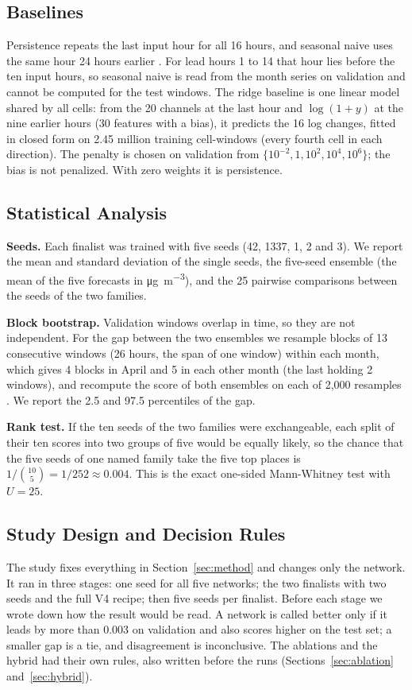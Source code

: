 \documentclass[journal]{IEEEtran}
\newcommand{\ugm}{\si{\micro\gram\per\cubic\metre}}
\begin{document}
\subsection{Baselines}
Persistence repeats the last input hour for all 16 hours, and seasonal naive uses the same hour 24 hours earlier \cite{hyndman2021}. For lead hours 1 to 14 that hour lies before the ten input hours, so seasonal naive is read from the month series on validation and cannot be computed for the test windows. The ridge baseline is one linear model shared by all cells: from the 20 channels at the last hour and $\log(1+y)$ at the nine earlier hours (30 features with a bias), it predicts the 16 log changes, fitted in closed form on 2.45 million training cell-windows (every fourth cell in each direction). The penalty is chosen on validation from $\{10^{-2}, 1, 10^{2}, 10^{4}, 10^{6}\}$; the bias is not penalized. With zero weights it is persistence.

\subsection{Statistical Analysis}
\label{sec:stats}
\textbf{Seeds.} Each finalist was trained with five seeds (42, 1337, 1, 2 and 3). We report the mean and standard deviation of the single seeds, the five-seed ensemble (the mean of the five forecasts in \ugm), and the 25 pairwise comparisons between the seeds of the two families.

\textbf{Block bootstrap.} Validation windows overlap in time, so they are not independent. For the gap between the two ensembles we resample blocks of 13 consecutive windows (26 hours, the span of one window) within each month, which gives 4 blocks in April and 5 in each other month (the last holding 2 windows), and recompute the score of both ensembles on each of 2{,}000 resamples \cite{kunsch1989}. We report the 2.5 and 97.5 percentiles of the gap.

\textbf{Rank test.} If the ten seeds of the two families were exchangeable, each split of their ten scores into two groups of five would be equally likely, so the chance that the five seeds of one named family take the five top places is $1/\binom{10}{5}=1/252\approx0.004$. This is the exact one-sided Mann-Whitney test with $U=25$.

\subsection{Study Design and Decision Rules}
\label{sec:study}
The study fixes everything in Section~\ref{sec:method} and changes only the network. It ran in three stages: one seed for all five networks; the two finalists with two seeds and the full V4 recipe; then five seeds per finalist. Before each stage we wrote down how the result would be read. A network is called better only if it leads by more than 0.003 on validation and also scores higher on the test set; a smaller gap is a tie, and disagreement is inconclusive. The ablations and the hybrid had their own rules, also written before the runs (Sections~\ref{sec:ablation} and~\ref{sec:hybrid}).
\end{document}
